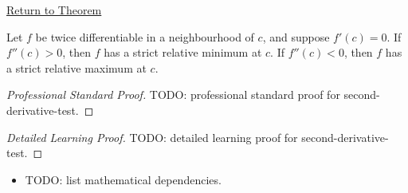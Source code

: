 \newpage
{}
\label{prf:second-derivative-test}

\begin{remark*}[Return]
\hyperref[thm:second-derivative-test]{Return to Theorem}
\end{remark*}

\begin{theorem*}
Let $f$ be twice differentiable in a neighbourhood of $c$, and suppose $f'(c)=0$. If $f''(c)>0$, then $f$ has a strict relative minimum at $c$. If $f''(c)<0$, then $f$ has a strict relative maximum at $c$.
\end{theorem*}

\begin{proof}[Professional Standard Proof]
\LRAProofBodyStart
TODO: professional standard proof for second-derivative-test.
\end{proof}

\begin{proof}[Detailed Learning Proof]
\LRAProofBodyStart
TODO: detailed learning proof for second-derivative-test.
\end{proof}

\begin{remark*}
\end{remark*}

\begin{dependencies}
\begin{itemize}
  \item TODO: list mathematical dependencies.
\end{itemize}
\end{dependencies}

\clearpage
